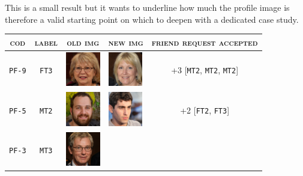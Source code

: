 \par \noindent This is a small result but it wants to underline how much the profile image is therefore a valid starting point on which to deepen with a dedicated case study.
\begin{table}[H]
\begin{center}
\begin{tabular}[c]{ |c|c|m{1.5cm}|m{1.5cm}|c| } 
	\hline
	\cellcolor[HTML]{b0d7ff}\textsc{cod} & 
	\cellcolor[HTML]{b0d7ff}\textsc{label} & 
	\multicolumn{1}{|c|}{\cellcolor[HTML]{b0d7ff}\textsc{old img}}&
	\multicolumn{1}{|c|}{\cellcolor[HTML]{b0d7ff}\textsc{new img}}&
	\cellcolor[HTML]{b0d7ff}\textsc{friend request accepted}\\
	\hline 
	\cellcolor[HTML]{b0d7ff}\texttt{PF-9}
	&\cellcolor[HTML]{e6f2ff}\texttt{FT3}
	&\vspace{.15cm}	\includegraphics[height=1.5cm]{immagini/FT3.jpg}
	&\vspace{.15cm}	\includegraphics[height=1.5cm]{immagini/FT3-new.jpg}
	& +3 [\texttt{MT2}, \texttt{MT2}, \texttt{MT2}]\\	 
	\hline 		
	\cellcolor[HTML]{b0d7ff}\texttt{PF-5}
	&\cellcolor[HTML]{e6f2ff}\texttt{MT2}
	&\vspace{.15cm}	\includegraphics[height=1.5cm]{immagini/MT2.jpg}
	&\vspace{.15cm}	\includegraphics[height=1.5cm]{immagini/MT2-new.jpg}
	& +2 [\texttt{FT2}, \texttt{FT3}]\\	 
	\hline
	\cellcolor[HTML]{b0d7ff}\texttt{PF-3}
	&\cellcolor[HTML]{e6f2ff}\texttt{MT3}
	&\vspace{.15cm}	\includegraphics[height=1.5cm]{immagini/MT3.jpg}

\end{tabular}
\end{center}
\end{table}
